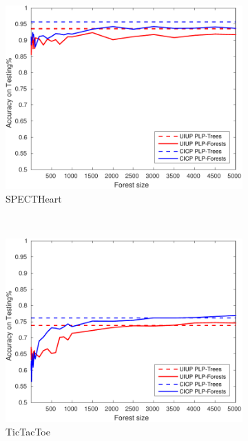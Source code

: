\begin{figure}[ht]
\begin{subfigure}[b]{0.3\textwidth}
  	\includegraphics[width=\textwidth]{figs/PLPTF/Forests/SpectHeartDownsampledFurther_Forests_MH.pdf}
  	\caption{SPECTHeart}
		\label{fig:S4}
	\end{subfigure}
  \\
  \begin{subfigure}[b]{0.3\textwidth}
		\centering
  	\includegraphics[width=\textwidth]{figs/PLPTF/Forests/TicTacToe_Forests_MH.pdf}
  	\caption{TicTacToe}
		\label{fig:T4}
	\end{subfigure}
  \begin{subfigure}[b]{0.3\textwidth}
		\centering

\end{subfigure}
\end{figure}
